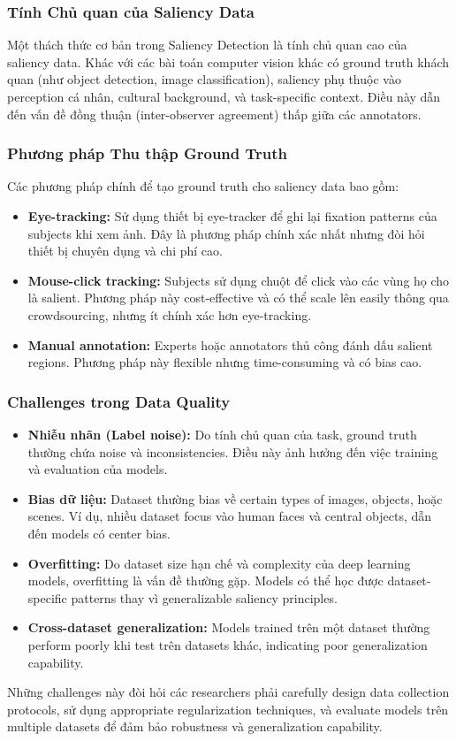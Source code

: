 \subsubsection{Tính Chủ quan của Saliency Data}

Một thách thức cơ bản trong Saliency Detection là tính chủ quan cao của saliency data. Khác với các bài toán computer vision khác có ground truth khách quan (như object detection, image classification), saliency phụ thuộc vào perception cá nhân, cultural background, và task-specific context. Điều này dẫn đến vấn đề đồng thuận (inter-observer agreement) thấp giữa các annotators.

\subsubsection{Phương pháp Thu thập Ground Truth}
\noindent Các phương pháp chính để tạo ground truth cho saliency data bao gồm:

\begin{itemize}
    \item \textbf{Eye-tracking:} Sử dụng thiết bị eye-tracker để ghi lại fixation patterns của subjects khi xem ảnh. Đây là phương pháp chính xác nhất nhưng đòi hỏi thiết bị chuyên dụng và chi phí cao.
    \item \textbf{Mouse-click tracking:} Subjects sử dụng chuột để click vào các vùng họ cho là salient. Phương pháp này cost-effective và có thể scale lên easily thông qua crowdsourcing, nhưng ít chính xác hơn eye-tracking.
    \item \textbf{Manual annotation:} Experts hoặc annotators thủ công đánh dấu salient regions. Phương pháp này flexible nhưng time-consuming và có bias cao.
\end{itemize}

\subsubsection{Challenges trong Data Quality}
\begin{itemize}
    \item \textbf{Nhiễu nhãn (Label noise):} Do tính chủ quan của task, ground truth thường chứa noise và inconsistencies. Điều này ảnh hưởng đến việc training và evaluation của models.
    \item \textbf{Bias dữ liệu:} Dataset thường bias về certain types of images, objects, hoặc scenes. Ví dụ, nhiều dataset focus vào human faces và central objects, dẫn đến models có center bias.
    \item \textbf{Overfitting:} Do dataset size hạn chế và complexity của deep learning models, overfitting là vấn đề thường gặp. Models có thể học được dataset-specific patterns thay vì generalizable saliency principles.
    \item \textbf{Cross-dataset generalization:} Models trained trên một dataset thường perform poorly khi test trên datasets khác, indicating poor generalization capability.
\end{itemize}
Những challenges này đòi hỏi các researchers phải carefully design data collection protocols, sử dụng appropriate regularization techniques, và evaluate models trên multiple datasets để đảm bảo robustness và generalization capability.
